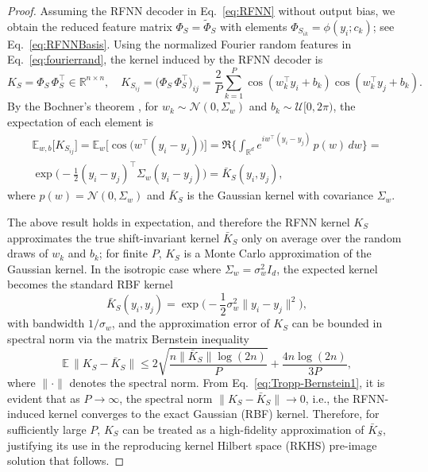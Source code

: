 \documentclass{article}
\begin{document}
\begin{proof}
Assuming the RFNN decoder in Eq.~\eqref{eq:RFNN} without output bias, we obtain the reduced feature matrix $\Phi_S=\widetilde{\Phi}_S$ with elements $\Phi_{S_{ik}}=\phi(y_i;c_k)$; see Eq.~\eqref{eq:RFNNBasis}. Using the normalized Fourier random features in Eq.~\eqref{eq:fourierrand}, the kernel induced by the RFNN decoder is
\begin{equation}
    K_S=\Phi_S\, \Phi_S^\top \in \mathbb{R}^{n \times n}, \quad K_{S_{ij}}=\big(\Phi_S \, \Phi_S^\top \big)_{ij}=\dfrac{2}{P}\sum_{k=1}^P \cos(w_k^\top y_i + b_k)\cos(w_k^\top y_j + b_k).
\end{equation}
By the Bochner's theorem \cite{rahimi2007random,rahimi2008uniform}, for $w_k\sim \mathcal{N}(0,\Sigma_w)$ and $b_k\sim \mathcal{U}[0,2\pi)$, the expectation of each element is
\begin{align}
\mathbb{E}_{w,b}\big[K_{S_{ij}}\big]
= \mathbb{E}_{w}\big[\cos \big(w^\top (y_i - y_j)\big)\big]
=\Re\Big\{\int_{\mathbb{R}^d} e^{i w^{\top} (y_i - y_j)}\, p(w)\, dw \Big\}= \nonumber \\
\exp\Big(-\frac{1}{2}(y_i - y_j)^\top \Sigma_w (y_i - y_j)\Big)=\bar{K}_S(y_i,y_j),
\label{eq:expectedcosines}
\end{align}
where $p(w)=\mathcal{N}(0,\Sigma_w)$ and $\bar{K}_S$ is the Gaussian kernel with covariance $\Sigma_w$. 

The above result holds in expectation, and therefore the RFNN kernel $K_S$ approximates the true shift-invariant kernel $\bar K_S$ only on average over the random draws of $w_k$ and $b_k$; for finite $P$, $K_S$ is a Monte Carlo approximation of the Gaussian kernel. In the isotropic case where $\Sigma_w = \sigma_w^2 I_d$, the expected kernel becomes the standard RBF kernel
\begin{equation}
  \bar K_S(y_i,y_j) = \exp\Big(-\dfrac{1}{2}\sigma_w^2\|y_i - y_j\|^2\Big),  
  \label{eq:RBF_kernel}
\end{equation}
with bandwidth $1/\sigma_w$, and the approximation error of $K_S$ can be bounded in spectral norm via the matrix Bernstein inequality \cite{tropp2015introduction}
\begin{equation}
\mathbb{E}\,\|K_S - \bar K_S\| \le
2 \sqrt{\frac{n \|\bar K_S\| \log(2n)}{P}} +
\frac{4 n \log(2n)}{3P},\label{eq:Tropp-Bernstein1}
\end{equation}
where $\|\cdot\|$ denotes the spectral norm. From Eq.~\eqref{eq:Tropp-Bernstein1}, it is evident that as $P \to \infty$, the spectral norm $\|K_S - \bar K_S\| \to 0$, i.e., the RFNN-induced kernel converges to the exact Gaussian (RBF) kernel. Therefore, for sufficiently large $P$, $K_S$ can be treated as a high-fidelity approximation of $\bar{K}_S$, justifying its use in the reproducing kernel Hilbert space (RKHS) pre-image solution that follows.


\end{proof}
\end{document}
